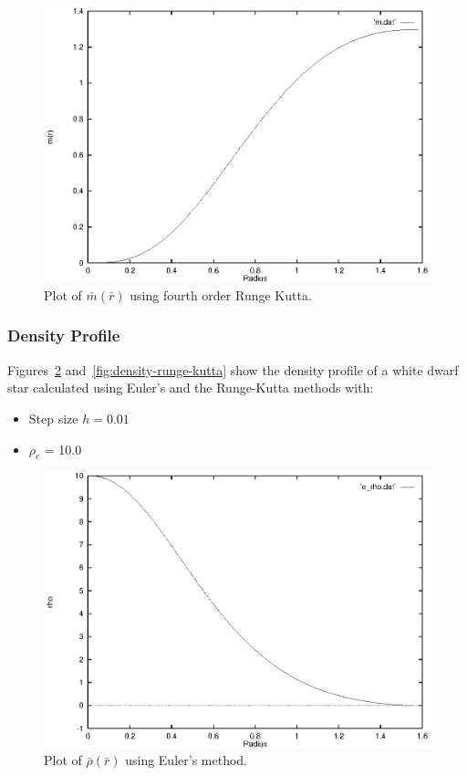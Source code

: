 \documentclass[a4paper]{IEEEtran}
\begin{document}
    \begin{figure} 
    \caption{Plot of $\bar{m}(\bar{r})$ using fourth order Runge Kutta.}
    \label{fig:mass-runge-kutta}  
    \begin{center}
        \includegraphics[width=\columnwidth]{figures/mass-rk-01}
    \end{center}
    \end{figure} 

    \subsubsection{Density Profile}
    Figures~\ref{fig:density-euler} and~\ref{fig:density-runge-kutta}
    show the density profile of a white dwarf star 
    calculated using Euler's and the Runge-Kutta methods with:
    \begin{itemize}
        \item Step size $h = 0.01$
        \item $\rho_c$ = 10.0
    \end{itemize}

    \begin{figure}
    \caption{Plot of $\bar{\rho}(\bar{r})$ using Euler's method.}
    \label{fig:density-euler} 
    \begin{center}
        \includegraphics[width=\columnwidth]{figures/density-euler-01}
    \end{center}
    \end{figure} 
\end{document}
